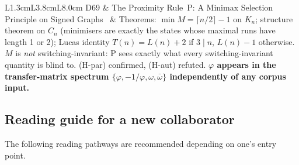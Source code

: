 \documentclass[11pt,a4paper]{article}
\theoremstyle{plain}
\theoremstyle{definition}
\theoremstyle{remark}
\begin{document}
\begin{longtable}{L{1.3cm}L{3.8cm}L{8.0cm}}
D69 & The Proximity Rule~P: A Minimax Selection Principle on Signed Graphs~\cite{D69} & \textcolor{proofblue}{Theorems}: $\min M=\lceil n/2\rceil-1$ on $K_n$; structure theorem on $C_n$ (minimisers are exactly the states whose maximal runs have length 1 or 2); Lucas identity $T(n)=L(n)+2$ if $3\mid n$, $L(n)-1$ otherwise. $M$ is \emph{not} switching-invariant: P sees exactly what every switching-invariant quantity is blind to. (H-par) confirmed, (H-aut) refuted. \textbf{$\varphi$ appears in the transfer-matrix spectrum $\{\varphi,-1/\varphi,\omega,\bar\omega\}$ independently of any corpus input.}\\[0.3em]
\end{longtable}

\subsection{Reading guide for a new collaborator}
\label{subsec:readingguide}
The following reading pathways are recommended depending on one's entry point.
\end{document}
